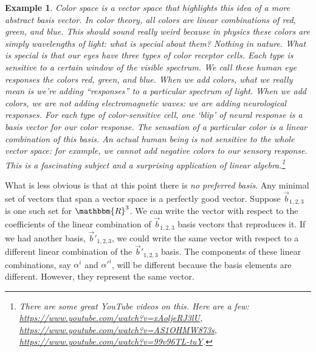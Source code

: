 \documentclass[12pt]{article}
\newtheorem{example}{Example}[section]
\begin{document}
\begin{example}
Color space is a vector space that highlights this idea of a more abstract basis vector. In color theory, all colors are linear combinations of red, green, and blue. This should sound really weird because in physics these colors are simply wavelengths of light: what is special about them? Nothing in nature. What is special is that our eyes have three types of color receptor cells. Each type is sensitive to a certain window of the visible spectrum. We call these human eye responses the colors red, green, and blue. When we add colors, what we really mean is we're adding ``responses'' to a particular spectrum of light. When we add colors, we are not adding electromagnetic waves: we are adding neurological responses. For each type of color-sensitive cell, one `blip' of neural response is a basis vector for our color response. The sensation of a particular color is a linear combination of this basis. An actual human being is not sensitive to the whole vector space: for example, we cannot add negative colors to our sensory response. This is a fascinating subject and a surprising application of linear algebra.\footnote{There are some great YouTube videos on this. Here are a few: \url{https://www.youtube.com/watch?v=xAoljeRJ3lU}, \url{https://www.youtube.com/watch?v=AS1OHMW873s}, \url{https://www.youtube.com/watch?v=99v96TL-tuY}.}
\end{example}


What is less obvious is that at this point there is \emph{no preferred basis}. Any minimal set of vectors that span a vector space is a perfectly good vector. Suppose $\vec{b}_{1,2,3}$ is one such set for $\mathbbm{R}^3$. We can write the vector with respect to the coefficients of the linear combination of  $\vec{b}_{1,2,3}$ basis vectors that reproduces it. If we had another basis, $\vec{b}'_{1,2,3}$, we could write the same vector with respect to a different linear combination of the $\vec{b}'_{1,2,3}$ basis. The components of these linear combinations, say $\alpha^i$ and $\alpha'^i$, will be different because the basis elements are different. However, they represent the same vector.
\end{document}
